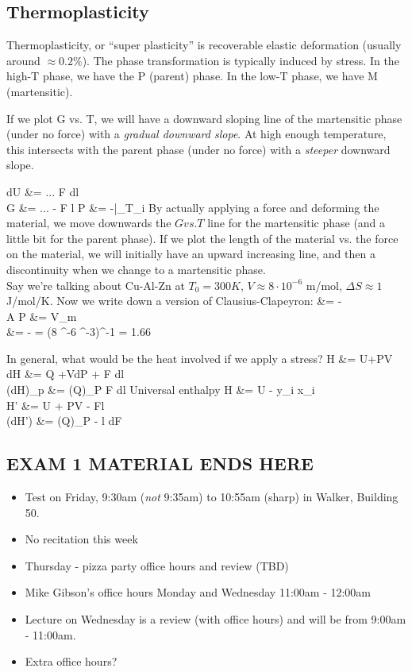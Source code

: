 \documentclass[12pt]{article}
\begin{document}
\subsection{Thermoplasticity}
Thermoplasticity, or ``super plasticity'' is recoverable elastic deformation (usually around $\approx 0.2\%$).  The phase transformation is typically induced by stress.  In the high-T phase, we have the P (parent) phase.  In the low-T phase, we have M (martensitic).

If we plot G vs. T, we will have a downward sloping line of the martensitic phase (under no force) with a \emph{gradual downward slope}.  At high enough temperature, this intersects with the parent phase (under no force) with a \emph{steeper} downward slope.

\eqs
dU &= ... F dl\\
G &= ... - F \cdot l
P &= -|_{T_i}
\eqe
By actually applying a force and deforming the material, we move downwards the $G vs. T$ line for the martensitic phase (and a little bit for the parent phase).  If we plot the length of the material vs. the force on the material, we will initially have an upward increasing line, and then a discontinuity when we change to a martensitic phase.\\

Say we're talking about Cu-Al-Zn at $T_0 = 300K$, $V \approx 8 \cdot 10^{-6}$ m\three/mol, $\Delta S \approx 1$ J/mol/K.  Now we write down a version of Clausius-Clapeyron:
\eqs
{}  &= -\\
A \Delta P &= V_m \Delta \epsilon\\
 &= - = (8 ^-6  ^{-3})^{-1} = 1.66 
\eqe

In general, what would be the heat involved if we apply a stress?
\eqs
H &= U+PV\\
dH &= \partial Q +VdP + F dl\\
(dH)_p &= (\partial Q)_P F dl
\eqe
Universal enthalpy
\eqs
H &= U - \sum y_i x_i\\
H' &= U + PV - Fl\\
(dH') &= (\partial Q)_P - l dF
\eqe
\subsection{EXAM 1 MATERIAL ENDS HERE}
\begin{itemize}
\item Test on Friday, 9:30am (\emph{not} 9:35am) to 10:55am (sharp) in Walker, Building 50.
\item No recitation this week
\item Thursday - pizza party office hours and review (TBD)
\item Mike Gibson's office hours Monday and Wednesday 11:00am - 12:00am
\item Lecture on Wednesday is a review (with office hours) and will be from 9:00am - 11:00am.
\item Extra office hours?
\end{itemize}
\end{document}
